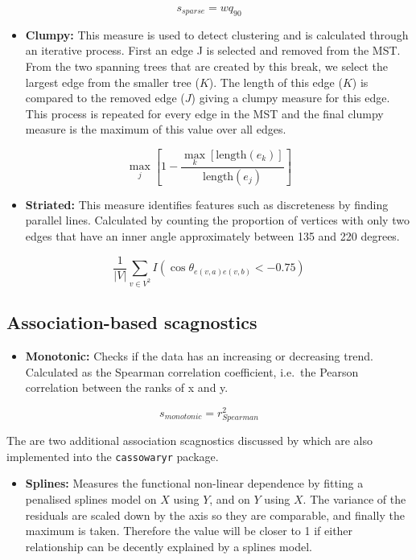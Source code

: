 \[s_{sparse}= wq_{90}\]

\begin{itemize}
\tightlist
\item
  \textbf{Clumpy:} This measure is used to detect clustering and is
  calculated through an iterative process. First an edge J is selected
  and removed from the MST. From the two spanning trees that are created
  by this break, we select the largest edge from the smaller tree
  (\(K\)). The length of this edge (\(K\)) is compared to the removed
  edge (\(J\)) giving a clumpy measure for this edge. This process is
  repeated for every edge in the MST and the final clumpy measure is the
  maximum of this value over all edges.
\end{itemize}

\[\max_{j}\left[ 1-\frac{\max_{k}[\mbox{length}(e_k)]}{\mbox{length}(e_j)}\right]\]

\begin{itemize}
\tightlist
\item
  \textbf{Striated:} This measure identifies features such as
  discreteness by finding parallel lines. Calculated by counting the
  proportion of vertices with only two edges that have an inner angle
  approximately between 135 and 220 degrees.
\end{itemize}

\[\frac1{|V|}\sum_{v \in V^{2}}I(\cos\theta_{e(v,a)e(v,b)}<-0.75)\]

\hypertarget{association-based-scagnostics}{%
\subsection{Association-based
scagnostics}\label{association-based-scagnostics}}

\begin{itemize}
\tightlist
\item
  \textbf{Monotonic:} Checks if the data has an increasing or decreasing
  trend. Calculated as the Spearman correlation coefficient, i.e.~the
  Pearson correlation between the ranks of x and y.
\end{itemize}

\[s_{monotonic} = r^2_{Spearman}\]

The are two additional association scagnostics discussed by
\citet{Grimm} which are also implemented into the \texttt{cassowaryr}
package.

\begin{itemize}
\tightlist
\item
  \textbf{Splines:} Measures the functional non-linear dependence by
  fitting a penalised splines model on \(X\) using \(Y\), and on \(Y\)
  using \(X\). The variance of the residuals are scaled down by the axis
  so they are comparable, and finally the maximum is taken. Therefore
  the value will be closer to 1 if either relationship can be decently
  explained by a splines model.
\end{itemize}


